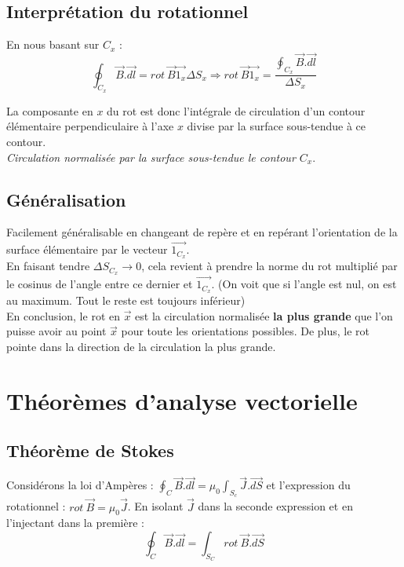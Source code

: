 \documentclass	[11pt, a4paper, openany]{book}
\begin{document}
\subsection{Interprétation du rotationnel}
En nous basant sur $C_x$ :
\begin{equation}
\oint_{C_x} \vec{B}.\vec{dl} = rot\ \vec{B}\vec{1_x}\Delta S_x \Rightarrow rot\ \vec{B}\vec{1_x} = \frac{\oint_{C_x} \vec{B}.\vec{dl}}{\Delta S_x}
\end{equation}

La composante en $x$ du rot est donc l'intégrale de circulation d'un contour élémentaire perpendiculaire à l'axe $x$ divise par la surface sous-tendue à ce contour.\\
\textit{Circulation normalisée par la surface sous-tendue le contour $C_x$}.

\subsection{Généralisation }
Facilement généralisable en changeant de repère et en repérant l'orientation de la surface élémentaire par le vecteur $\vec{1_{C_x}}$.\\

En faisant tendre $\Delta S_{C_x} \rightarrow 0$, cela revient à prendre la norme du rot multiplié par le cosinus de l'angle entre ce dernier et $\vec{1_{C_x}}$. (On voit que si l'angle est nul, on est au maximum. Tout le reste est toujours inférieur)\\

En conclusion, le rot en $\vec{x}$ est la circulation normalisée \textbf{la plus grande} que l'on puisse avoir au point $\vec{x}$ pour toute les orientations possibles. De plus, le rot pointe dans la direction de la circulation la plus grande. 

\section{Théorèmes d'analyse vectorielle}
\subsection{Théorème de Stokes}
Considérons la loi d'Ampères : $\oint_C \vec{B}.\vec{dl} = \mu_0 \int_{S_c} \vec{J}.\vec{dS}$ et l'expression du rotationnel : $rot\ \vec{B} = \mu_0\vec{J}$. En isolant $\vec{J}$ dans la seconde expression et en l'injectant dans la première :
\begin{equation}
\oint_C \vec{B}.\vec{dl} = \int_{S_C} rot\ \vec{B}.\vec{dS}
\end{equation}
\end{document}
